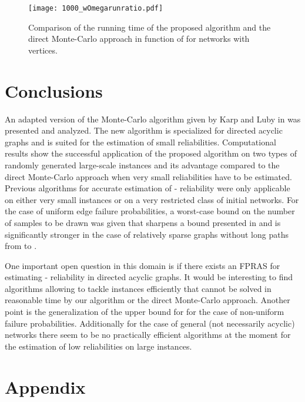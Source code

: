 \documentclass{article}
\begin{document}
\begin{figure}[ht!]
\begin{center}
\texttt{[image: 1000\_wOmegarunratio.pdf]}
\caption{\label{fig:1000_wOmegarunratio} Comparison of the running time of the proposed
algorithm and the direct \mbox{Monte-Carlo} approach in function of 
for networks with  vertices.}
\end{center}
\end{figure}

\section{Conclusions}

An adapted version of the Monte-Carlo algorithm given by Karp and Luby
in \cite{karp_1985_montecarlo} was presented and analyzed.
The new algorithm is specialized for directed acyclic graphs and is suited for the estimation
of small reliabilities. Computational results show the successful
application of the proposed algorithm on two types of randomly
generated large-scale instances 
and its advantage compared to the direct \mbox{Monte-Carlo} approach
when very small reliabilities have to be estimated.
Previous algorithms for accurate estimation of - reliability
were only applicable on either very small instances or on
a very restricted class of initial networks.
For the case of uniform
edge failure probabilities, a \mbox{worst-case} bound
on the number of samples to be drawn was given that sharpens a bound presented in
\cite{karp_1985_montecarlo} and is significantly stronger in the case of
relatively sparse graphs without long paths from  to .


One important open question in this domain is if there exists an FPRAS
for estimating - reliability in directed acyclic graphs. It would be interesting to
find algorithms allowing to tackle instances
efficiently that cannot be solved in reasonable time by our algorithm or the
direct \mbox{Monte-Carlo} approach.
Another point is the generalization of the upper bound for 
for the case of \mbox{non-uniform} failure probabilities.
Additionally for the case of general (not necessarily acyclic) networks
there seem to be no practically efficient algorithms at the moment for the
estimation of low reliabilities on large instances.







\section*{Appendix}
\end{document}
